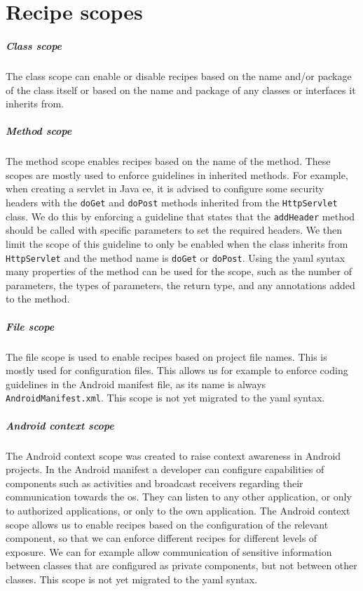 \chapter{Recipe scopes}
\label{app:recipe-scopes}
\paragraph{Class scope} The class scope can enable or disable recipes based on the name and/or package of the class itself or based on the name and package of any classes or interfaces it inherits from. 

\paragraph{Method scope} The {method scope} enables recipes based on the name of the method. These scopes are mostly used to enforce guidelines in inherited methods. For example, when creating a servlet in Java \gls{ee}, it is advised to configure some security headers with the \texttt{doGet} and \texttt{doPost} methods inherited from the \texttt{HttpServlet} class. We do this by enforcing a guideline that states that the \texttt{addHeader} method should be called with specific parameters to set the required headers. We then limit the scope of this guideline to only be enabled when the class inherits from \texttt{HttpServlet} and the method name is  \texttt{doGet} or \texttt{doPost}. Using the \gls{yaml} syntax many properties of the method can be used for the scope, such as the number of parameters, the types of parameters, the return type, and any annotations added to the method.

\paragraph{File scope} The {file scope} is used to enable recipes based on project file names. This is mostly used for configuration files. This allows us for example to enforce coding guidelines in the Android manifest file, as its name is always \texttt{AndroidManifest.xml}. This scope is not yet migrated to the \gls{yaml} syntax.

\paragraph{Android context scope} The {Android context scope} was created to raise context awareness in Android projects. In the Android manifest a developer can configure capabilities of components such as activities and broadcast receivers regarding their communication towards the \gls{os}. They can listen to any other application, or only to authorized applications, or only to the own application. The Android context scope allows us to enable recipes based on the configuration of the relevant component, so that we can enforce different recipes for different levels of exposure. We can for example allow communication of sensitive information between classes that are configured as private components, but not between other classes. This scope is not yet migrated to the \gls{yaml} syntax.

